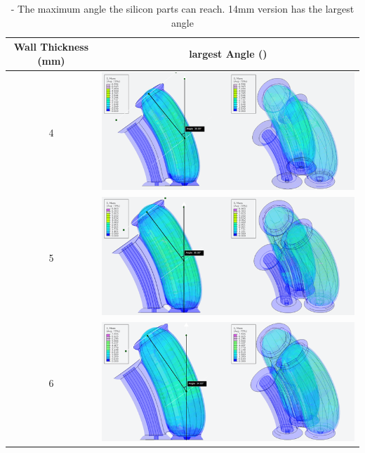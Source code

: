 \documentclass[twoside, 11pt]{article}
\begin{document}
\begin{table} [H]
	\centering
	\begin{tabular}{|c|c|}
	\hline
	Wall Thickness (mm) & largest Angle (\degree)\\
	\hline
	4 & \includegraphics[align=c, scale=0.6]{d14}\\
	\hline
	5 & \includegraphics[align=c, scale=0.6]{d15}\\
	\hline
	6 & \includegraphics[align=c, scale=0.6]{d16}\\
	\hline
	\end{tabular}
	\caption{- The maximum angle the silicon parts can reach. 14mm version has the largest angle}
\end{table}
\end{document}
